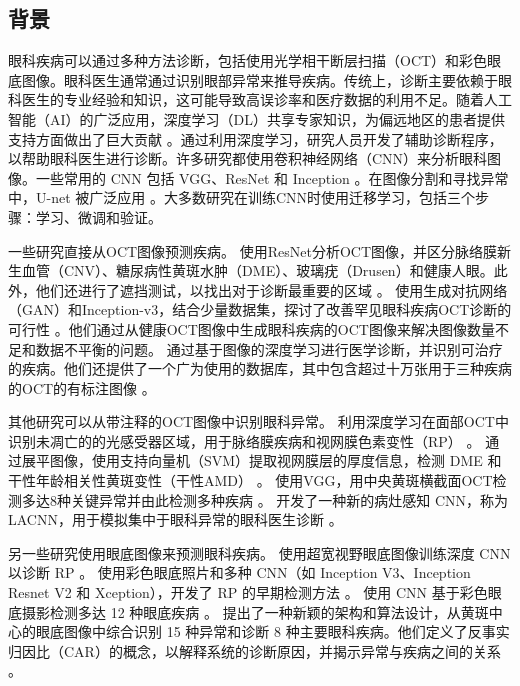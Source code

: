 \documentclass{article}
\begin{document}
	\begin{multicols}{2}
	
	\section{背景}
	
	眼科疾病可以通过多种方法诊断，包括使用光学相干断层扫描（OCT）和彩色眼底图像。眼科医生通常通过识别眼部异常来推导疾病。传统上，诊断主要依赖于眼科医生的专业经验和知识，这可能导致高误诊率和医疗数据的利用不足。随着人工智能（AI）的广泛应用，深度学习（DL）共享专家知识，为偏远地区的患者提供支持方面做出了巨大贡献 \autocite{Ichhpujani_Thakur_2021}。通过利用深度学习，研究人员开发了辅助诊断程序，以帮助眼科医生进行诊断。许多研究都使用卷积神经网络（CNN）来分析眼科图像。一些常用的 CNN 包括 VGG、ResNet 和 Inception \autocite{daich2023artificial}。在图像分割和寻找异常中，U-net 被广泛应用 \autocite{Ronneberger_Fischer_Brox_2015}。大多数研究在训练CNN时使用迁移学习，包括三个步骤：学习、微调和验证。
	
	一些研究直接从OCT图像预测疾病。\citeauthor{li2019deep} 使用ResNet分析OCT图像，并区分脉络膜新生血管（CNV）、糖尿病性黄斑水肿（DME）、玻璃疣（Drusen）和健康人眼。此外，他们还进行了遮挡测试，以找出对于诊断最重要的区域 \autocite{li2019deep}。\citeauthor{yoo2021feasibility} 使用生成对抗网络（GAN）和Inception-v3，结合少量数据集，探讨了改善罕见眼科疾病OCT诊断的可行性 \autocite{yoo2021feasibility}。他们通过从健康OCT图像中生成眼科疾病的OCT图像来解决图像数量不足和数据不平衡的问题。\citeauthor{Kermany2018} 通过基于图像的深度学习进行医学诊断，并识别可治疗的疾病。他们还提供了一个广为使用的数据库，其中包含超过十万张用于三种疾病的OCT的有标注图像 \autocite{Kermany2018}。
	
	其他研究可以从带注释的OCT图像中识别眼科异常。\citeauthor{camino2018deep} 利用深度学习在面部OCT中识别未凋亡的的光感受器区域，用于脉络膜疾病和视网膜色素变性（RP） \autocite{camino2018deep}。\citeauthor{srinivasan2014fully} 通过展平图像，使用支持向量机（SVM）提取视网膜层的厚度信息，检测 DME 和干性年龄相关性黄斑变性（干性AMD） \autocite{srinivasan2014fully}。\citeauthor{leandro2023oct} 使用VGG，用中央黄斑横截面OCT检测多达8种关键异常并由此检测多种疾病 \autocite{leandro2023oct}。\citeauthor{Fang_Wang2019} 开发了一种新的病灶感知 CNN，称为 LACNN，用于模拟集中于眼科异常的眼科医生诊断 \autocite{Fang_Wang2019}。
	
	另一些研究使用眼底图像来预测眼科疾病。\citeauthor{masumoto2019accuracy} 使用超宽视野眼底图像训练深度 CNN 以诊断 RP \autocite{masumoto2019accuracy}。\citeauthor{chen2021artificial} 使用彩色眼底照片和多种 CNN（如 Inception V3、Inception Resnet V2 和 Xception），开发了 RP 的早期检测方法 \autocite{chen2021artificial}。\citeauthor{li2022development} 使用 CNN 基于彩色眼底摄影检测多达 12 种眼底疾病 \autocite{li2022development}。\citeauthor{Son2023} 提出了一种新颖的架构和算法设计，从黄斑中心的眼底图像中综合识别 15 种异常和诊断 8 种主要眼科疾病。他们定义了反事实归因比（CAR）的概念，以解释系统的诊断原因，并揭示异常与疾病之间的关系 \autocite{Son2023}。
	

\end{multicols}
\end{document}
